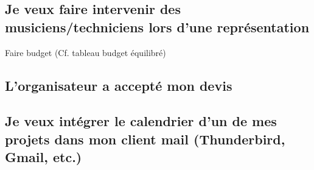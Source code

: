 \documentclass[a4paper]{article}
\begin{document}
\subsection{Je veux faire intervenir des musiciens/techniciens lors d'une représentation}
\label{sec:HowToInterventionFournisseur}
Faire budget (Cf. tableau budget équilibré)


\subsection{L'organisateur a accepté mon devis}
\label{sec:HowToAcceptationDevis}

\subsection{Je veux intégrer le calendrier d'un de mes projets dans mon client mail (Thunderbird, Gmail, etc.)}
\label{sec:HowToIntegrerCalendar}




\newpage \printbibheading
\printbibliography[nottype=online,check=notonline,heading=subbibliography,title={Bibliographiques}]
\printbibliography[check=online,heading=subbibliography,title={Webographiques}]
\nocite{*}
\end{document}
